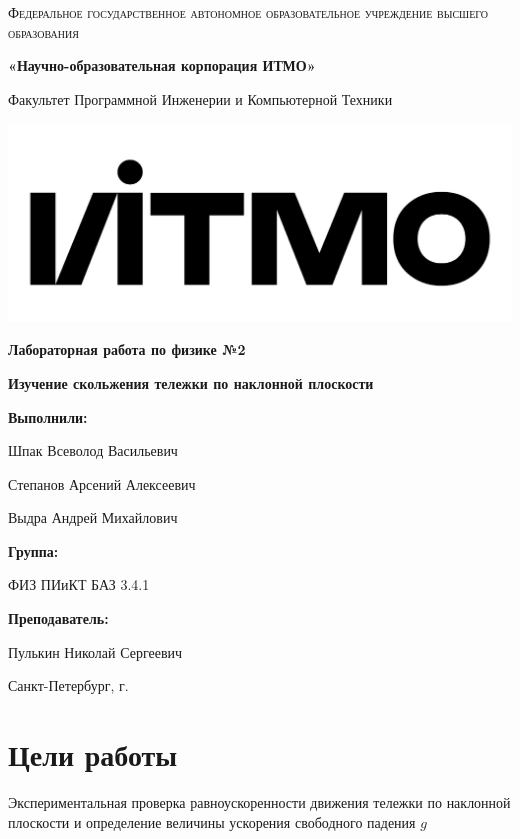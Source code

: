 \documentclass[12pt,a4paper]{article}
\begin{document}
\begin{titlepage} 
	\centering
	{
        \scshape
        Федеральное государственное автономное образовательное учреждение высшего образования
        \par
        \textbf{«Научно-образовательная корпорация ИТМО»}
        \par
        \vspace*{1cm}
        Факультет Программной Инженерии и Компьютерной Техники
        \par
    }
    \vspace*{0.6cm}
    \includegraphics[width=\textwidth]{logo.png}
    {
        \Large
        \textbf{Лабораторная работа по физике №2}
        \par
        \normalsize
        \vspace*{0.75cm}
        \textbf{Изучение скольжения тележки по наклонной плоскости}
        \par
    }
    \vfill
    \hfill\begin{minipage}{\dimexpr\textwidth-7.8cm}
        \textbf{Выполнили:}\par
        Шпак Всеволод Васильевич\par
        Степанов Арсений Алексеевич\par
        Выдра Андрей Михайлович\par
        \vspace*{0.15cm}
        \textbf{Группа:}\par
        ФИЗ ПИиКТ БАЗ 3.4.1\par 
        \vspace*{0.15cm}
        \textbf{Преподаватель:}\par
        Пулькин Николай Сергеевич\par
    \end{minipage}
    \vfill
    Санкт-Петербург, \the\year{}г.
\end{titlepage}  
\section{Цели работы}
Экспериментальная проверка равноускоренности движения тележки по наклонной плоскости и определение величины ускорения свободного падения $g$
\end{document}
